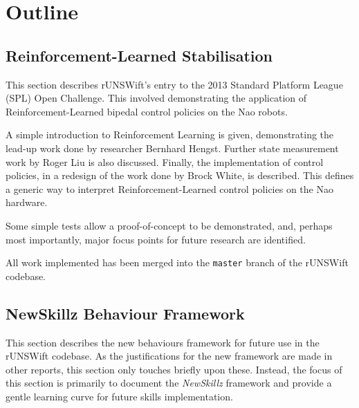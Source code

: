 \documentclass[pdftex,11pt,a4paper]{report}
\begin{document}
\newpage
\setcounter{tocdepth}{1} %
\tableofcontents
\newpage
{}
\hypersetup{pageanchor=true}

\chapter{Outline}

\section*{Reinforcement-Learned Stabilisation}
This section describes rUNSWift's entry to the 2013 Standard Platform League (SPL) Open Challenge. This involved demonstrating the application of Reinforcement-Learned bipedal control policies on the Nao robots.

A simple introduction to Reinforcement Learning is given, demonstrating the lead-up work done by researcher Bernhard Hengst.\cite{bernhard_rl} Further state measurement work by Roger Liu is also discussed.\cite{liu} Finally, the implementation of control policies, in a redesign of the work done by Brock White, is described.\cite{white} This defines a generic way to interpret Reinforcement-Learned control policies on the Nao hardware. 

Some simple tests allow a proof-of-concept to be demonstrated, and, perhaps most importantly, major focus points for future research are identified.

All work implemented has been merged into the \texttt{master} branch of the rUNSWift codebase.

\section*{NewSkillz Behaviour Framework}

This section describes the new behaviours framework for future use in the rUNSWift codebase. As the justifications for the new framework are made in other reports\cite{simulator}, this section only touches briefly upon these. Instead, the focus of this section is primarily to document the \textit{NewSkillz} framework and provide a gentle learning curve for future skills implementation.
\end{document}
